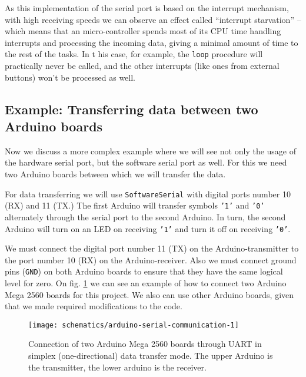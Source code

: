 \documentclass[../sparc.tex]{subfiles}
\begin{document}
As this implementation of the serial port is based on the interrupt mechanism,
with high receiving speeds we can observe an effect called ``interrupt
starvation'' -- which means that an micro-controller spends most of its CPU time
handling interrupts and processing the incoming data, giving a minimal amount of
time to the rest of the tasks.  In t his case, for example, the \texttt{loop}
procedure will practically never be called, and the other interrupts (like ones
from external buttons) won't be processed as well.

\subsection{Example: Transferring data between two Arduino boards}

Now we discuss a more complex example where we will see not only the usage of
the hardware serial port, but the software serial port as well.  For this we
need two Arduino boards between which we will transfer the data.

For data transferring we will use \texttt{SoftwareSerial} with digital ports
number 10 (RX) and 11 (TX.)  The first Arduino will transfer symbols
\texttt{'1'} and \texttt{'0'} alternately through the serial port to the second
Arduino.  In turn, the second Arduino will turn on an LED on receiving
\texttt{'1'} and turn it off on receiving \texttt{'0'}.

We must connect the digital port number 11 (TX) on the Arduino-transmitter to
the port number 10 (RX) on the Arduino-receiver.  Also we must connect ground
pins (\texttt{GND}) on both Arduino boards to ensure that they have the same
logical level for zero.  On fig. \ref{fig:arduino-serial-communication-1} we can
see an example of how to connect two Arduino Mega 2560 boards for this project.
We also can use other Arduino boards, given that we made required modifications
to the code.

\begin{figure}[H]
  \centering
  \texttt{[image: schematics/arduino-serial-communication-1]}
  \caption{Connection of two Arduino Mega 2560 boards through UART in simplex
    (one-directional) data transfer mode.  The upper Arduino is the transmitter,
    the lower arduino is the receiver.}
  \label{fig:arduino-serial-communication-1}
\end{figure}
\end{document}
